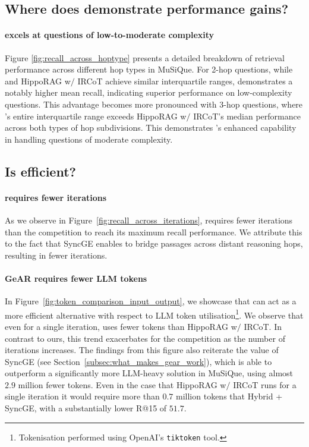 \subsection{Where does \gear demonstrate performance gains?}
\paragraph{\gear excels at questions of low-to-moderate complexity}

Figure \ref{fig:recall_across_hoptype} presents a detailed breakdown of retrieval performance across different hop types in MuSiQue. For 2-hop questions, while \gear and HippoRAG w$/$ IRCoT achieve similar interquartile ranges, \gear demonstrates a notably higher mean recall, indicating superior performance on low-complexity questions. This advantage becomes more pronounced with 3-hop questions, where \gear's entire interquartile range exceeds HippoRAG w$/$ IRCoT's median performance across both types of hop subdivisions. This demonstrates  \gear's enhanced capability in handling questions of moderate complexity.


\subsection{Is \gear efficient?}
\label{subsec:gear_efficient}
\paragraph{\gear requires fewer iterations}
As we observe in Figure~\ref{fig:recall_across_iterations}, \gear requires fewer iterations than the competition to reach its maximum recall performance. We attribute this to the fact that SyncGE enables \gear to bridge passages across distant reasoning hops, resulting in fewer iterations.





\paragraph{GeAR requires fewer LLM tokens}In Figure~\ref{fig:token_comparison_input_output}, we showcase that \gear can act as a more efficient alternative with respect to LLM token utilisation\footnote{Tokenisation performed using OpenAI's \texttt{tiktoken} tool.}. We observe that even for a single iteration, \gear uses fewer tokens than HippoRAG w$/$ IRCoT. In contrast to ours, this trend exacerbates for the competition as the number of iterations increases. The findings from this figure also reiterate the value of SyncGE (see Section~\ref{subsec:what_makes_gear_work}), which is able to outperform a significantly more LLM-heavy solution in MuSiQue, using almost $2.9$ million fewer tokens. Even in the case that HippoRAG w$/$ IRCoT runs for a single iteration it would require more than $0.7$ million tokens that Hybrid + SyncGE, with a substantially lower R@15 of $51.7$.

